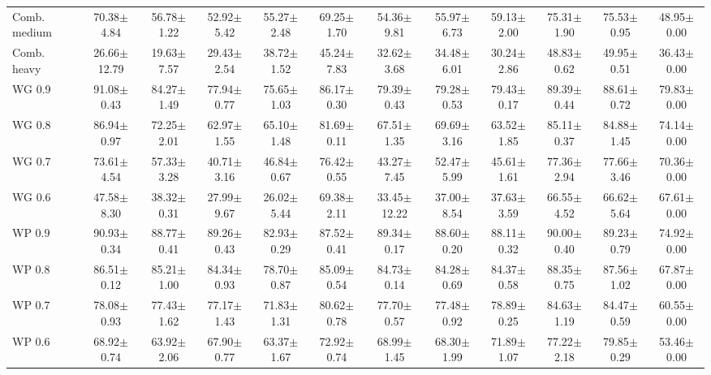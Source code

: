 \begin{table}[!t]
{\begin{tabular}{lccccccccccc}
Comb. medium & 70.38$\pm$4.84 & 56.78$\pm$1.22 & 52.92$\pm$5.42 & 55.27$\pm$2.48 & 69.25$\pm$1.70 & 54.36$\pm$9.81 & 55.97$\pm$6.73 & 59.13$\pm$2.00 & 75.31$\pm$1.90 & 75.53$\pm$0.95 & 48.95$\pm$0.00 \\
Comb. heavy & 26.66$\pm$12.79 & 19.63$\pm$7.57 & 29.43$\pm$2.54 & 38.72$\pm$1.52 & 45.24$\pm$7.83 & 32.62$\pm$3.68 & 34.48$\pm$6.01 & 30.24$\pm$2.86 & 48.83$\pm$0.62 & 49.95$\pm$0.51 & 36.43$\pm$0.00 \\
WG 0.9 & 91.08$\pm$0.43 & 84.27$\pm$1.49 & 77.94$\pm$0.77 & 75.65$\pm$1.03 & 86.17$\pm$0.30 & 79.39$\pm$0.43 & 79.28$\pm$0.53 & 79.43$\pm$0.17 & 89.39$\pm$0.44 & 88.61$\pm$0.72 & 79.83$\pm$0.00 \\
WG 0.8 & 86.94$\pm$0.97 & 72.25$\pm$2.01 & 62.97$\pm$1.55 & 65.10$\pm$1.48 & 81.69$\pm$0.11 & 67.51$\pm$1.35 & 69.69$\pm$3.16 & 63.52$\pm$1.85 & 85.11$\pm$0.37 & 84.88$\pm$1.45 & 74.14$\pm$0.00 \\
WG 0.7 & 73.61$\pm$4.54 & 57.33$\pm$3.28 & 40.71$\pm$3.16 & 46.84$\pm$0.67 & 76.42$\pm$0.55 & 43.27$\pm$7.45 & 52.47$\pm$5.99 & 45.61$\pm$1.61 & 77.36$\pm$2.94 & 77.66$\pm$3.46 & 70.36$\pm$0.00 \\
WG 0.6 & 47.58$\pm$8.30 & 38.32$\pm$0.31 & 27.99$\pm$9.67 & 26.02$\pm$5.44 & 69.38$\pm$2.11 & 33.45$\pm$12.22 & 37.00$\pm$8.54 & 37.63$\pm$3.59 & 66.55$\pm$4.52 & 66.62$\pm$5.64 & 67.61$\pm$0.00 \\
WP 0.9 & 90.93$\pm$0.34 & 88.77$\pm$0.41 & 89.26$\pm$0.43 & 82.93$\pm$0.29 & 87.52$\pm$0.41 & 89.34$\pm$0.17 & 88.60$\pm$0.20 & 88.11$\pm$0.32 & 90.00$\pm$0.40 & 89.23$\pm$0.79 & 74.92$\pm$0.00 \\
WP 0.8 & 86.51$\pm$0.12 & 85.21$\pm$1.00 & 84.34$\pm$0.93 & 78.70$\pm$0.87 & 85.09$\pm$0.54 & 84.73$\pm$0.14 & 84.28$\pm$0.69 & 84.37$\pm$0.58 & 88.35$\pm$0.75 & 87.56$\pm$1.02 & 67.87$\pm$0.00 \\
WP 0.7 & 78.08$\pm$0.93 & 77.43$\pm$1.62 & 77.17$\pm$1.43 & 71.83$\pm$1.31 & 80.62$\pm$0.78 & 77.70$\pm$0.57 & 77.48$\pm$0.92 & 78.89$\pm$0.25 & 84.63$\pm$1.19 & 84.47$\pm$0.59 & 60.55$\pm$0.00 \\
WP 0.6 & 68.92$\pm$0.74 & 63.92$\pm$2.06 & 67.90$\pm$0.77 & 63.37$\pm$1.67 & 72.92$\pm$0.74 & 68.99$\pm$1.45 & 68.30$\pm$1.99 & 71.89$\pm$1.07 & 77.22$\pm$2.18 & 79.85$\pm$0.29 & 53.46$\pm$0.00 \\
\hline
\end{tabular}}
\end{table}
